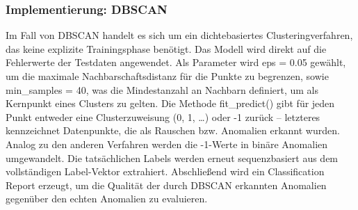 \documentclass[a4paper,12pt]{article}
\begin{document}
	\subsubsection{Implementierung: DBSCAN}
	Im Fall von DBSCAN handelt es sich um ein dichtebasiertes Clusteringverfahren, das keine explizite Trainingsphase benötigt. Das Modell wird direkt auf die Fehlerwerte der Testdaten angewendet. Als Parameter wird eps = 0.05 gewählt, um die maximale Nachbarschaftsdistanz für die Punkte zu begrenzen, sowie min\_samples = 40, was die Mindestanzahl an Nachbarn definiert, um als Kernpunkt eines Clusters zu gelten. Die Methode fit\_predict() gibt für jeden Punkt entweder eine Clusterzuweisung (0, 1, …) oder -1 zurück – letzteres kennzeichnet Datenpunkte, die als Rauschen bzw. Anomalien erkannt wurden.
	Analog zu den anderen Verfahren werden die -1-Werte in binäre Anomalien umgewandelt. Die tatsächlichen Labels werden erneut sequenzbasiert aus dem vollständigen Label-Vektor extrahiert. Abschließend wird ein Classification Report erzeugt, um die Qualität der durch DBSCAN erkannten Anomalien gegenüber den echten Anomalien zu evaluieren.
	
\end{document}
